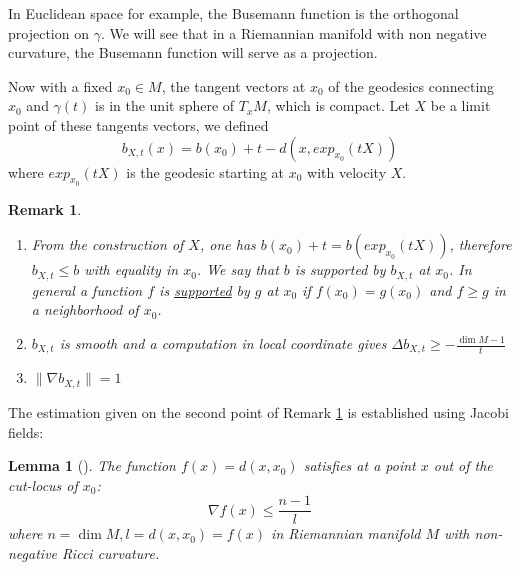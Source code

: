 \documentclass[11pt]{article}
\newtheorem{remark}{Remark}
\newtheorem{lemma}[theorem]{Lemma}
\begin{document}
In Euclidean space for example, the Busemann function is the orthogonal projection on \(\gamma\). We
will see that in a Riemannian manifold with non negative curvature, the Busemann function will serve
as a projection.


Now with a fixed \(x_0\in M\), the tangent vectors at \(x_0\) of the geodesics connecting \(x_0\) and
\(\gamma(t)\) is in the unit sphere of \(T_xM\), which is compact. Let \(X\) be a limit point of these
tangents vectors, we defined
\[
b_{X,t}(x) = b(x_0) + t - d(x, exp_{x_0}(tX))
\]
where \(exp_{x_0}(tX)\) is the geodesic starting at \(x_0\) with velocity \(X\).

\begin{remark}
\label{rem:3-calcul-cheeger-gromoll}
\label{org584320e}
\begin{enumerate}
\item From the construction of \(X\), one has \(b(x_0) + t = b(exp_{x_0}(tX))\), therefore \(b_{X,t} \leq b\) with
equality in \(x_0\). We say that \(b\) is supported by \(b_{X,t}\) at \(x_0\). In general a function \(f\) 
is \uline{supported} by \(g\) at \(x_0\) if \(f(x_0)=g(x_0)\) and \(f\geq g\) in a neighborhood of \(x_0\).
\item \(b_{X,t}\) is smooth and a computation in local coordinate gives \(\Delta b_{X,t} \geq -\frac{\dim
   M - 1}{t}\)
\item \(\|\nabla b_{X,t}\| = 1\)
\end{enumerate}
\end{remark}

The estimation given on the second point of Remark \ref{rem:3-calcul-cheeger-gromoll} is established
using Jacobi fields:

\begin{lemma}[]
The function \(f(x) = d(x,x_0)\) satisfies at a point \(x\) out of the cut-locus of \(x_0\):
\[
\nabla f(x) \leq \frac{n-1}{l}
\]
where \(n=\dim M, l = d(x,x_0) = f(x)\) in Riemannian manifold \(M\) with non-negative Ricci curvature.
\end{lemma}
\end{document}
